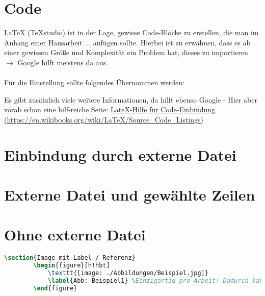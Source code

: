 \documentclass{scrarticle}
\begin{document}
	\section{Code}
	LaTeX (TeXstudio) ist in der Lage, gewisse Code-Blöcke zu erstellen, die man im Anhang einer Hausarbeit ... anfügen sollte. Hierbei ist zu erwähnen, dass es ab einer gewissen Größe und Komplexität ein Problem hat, dieses zu importieren $\rightarrow$ Google hilft meistens da aus.
	\\\\\noindent
	Für die Einstellung sollte folgendes Übernommen werden:
	
	\vspace*{1cm}\noindent
	Es gibt zusätzlich viele weitere Informationen, da hilft ebenso Google - Hier aber vorab schon eine hilf-reiche Seite:
	\href{https://en.wikibooks.org/wiki/LaTeX/Source\_Code\_Listings}{LateX-Hilfe für Code-Einbindung (https://en.wikibooks.org/wiki/LaTeX/Source\_Code\_Listings)}
	
	\section{Einbindung durch externe Datei}
	
	\section{Externe Datei und gewählte Zeilen}
	
	\newpage\noindent
	\section{Ohne externe Datei}
	\begin{lstlisting}[language=TeX]
		\section{Image mit Label / Referenz}
		\begin{figure}[h!hbt]
			\texttt{[image: ./Abbildungen/Beispiel.jpg]}
			\label{Abb: Beispiel1} %Einzigartig pro Arbeit! Dadurch kann man eine Direkt-Referenz auf das Bild erstellen.
		\end{figure}
	\end{lstlisting}
	
\end{document}
